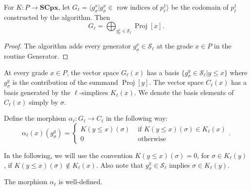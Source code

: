 \documentclass[english,a4paper,nolineno,cleveref]{socg-lipics-v2021}
\DeclareMathOperator{\proj}{Proj}
\begin{document}
\begin{proposition} \label{prop:correct_generators}
For $K\colon P\rightarrow\mathbf{SCpx}$, let $G_\ell= \langle g_{\sigma}^x\vert g_\sigma^x\in \text{ row indices of }p_\ell^1 \rangle$ be the codomain of $p_\ell^1$ constructed by the algorithm. Then 
\begin{equation*}
G_\ell=\bigoplus_{g^x_\sigma\in\mathcal{S}_\ell}\proj[x] . 
\end{equation*}
\end{proposition}

\begin{proof}
The algorithm adds every generator $g^x_\sigma\in\mathcal{S}_\ell$ at the grade $x\in P$ in the routine {\sc Generator}.    
\end{proof}


At every grade $x\in P$, the vector space $G_\ell(x)$ has a basis $\{g_\sigma^y\in \mathcal{S}_\ell\vert y\leq x\}$ where $g^y_\sigma$ is the contribution of the summand $\proj[y]$. The vector space $C_\ell(x)$ has a basis generated by the $\ell$-simplices $K_\ell(x)$. We denote the basis elements of $C_\ell(x)$ simply by $\sigma$.   


\begin{definition} \label{def:alpha}
Define the morphism $\alpha_\ell\colon G_\ell\rightarrow C_\ell$ in the following way:
\begin{equation*}
\alpha_\ell(x)(g^y_\sigma)=\begin{cases} K(y\leq x)(\sigma) & \mbox{ if } K(y\leq x)(\sigma)\in K_\ell(x) \\ 0 &   \text{ otherwise} \end{cases}.
\end{equation*}   
\end{definition}


In the following, we will use the convention $K(y\leq x)(\sigma)=0$, for $\sigma\in K_\ell(y)$, if $K(y\leq x)(\sigma)\notin K_\ell(x)$. Also note that $g^y_\sigma\in\mathcal{S}_\ell$ implies $\sigma\in K_\ell(y)$.


\begin{proposition} \label{prop:alpha_well_defined}
The morphism $\alpha_\ell$ is well-defined.
\end{proposition}
\end{document}
